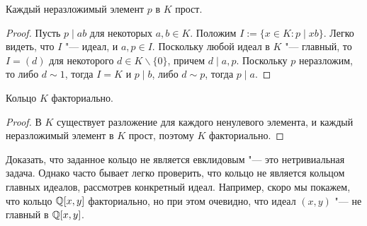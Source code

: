 \begin{proposition}
	Каждый неразложимый элемент $p$ в $K$ прост.
\end{proposition}

\begin{proof}
	Пусть $p \mid ab$ для некоторых $a, b \in K$. Положим $I := \{x \in K: p \mid xb\}$. Легко видеть, что $I$ "--- идеал, и $a, p \in I$. Поскольку любой идеал в $K$ "--- главный, то $I = (d)$ для некоторого $d \in K \backslash \{0\}$, причем $d \mid a, p$. Поскольку $p$ неразложим, то либо $d \sim 1$, тогда $I = K$ и $p \mid b$, либо $d \sim p$, тогда $p \mid a$.
\end{proof}

\begin{theorem}
	Кольцо $K$ факториально.
\end{theorem}

\begin{proof}
	В $K$ существует разложение для каждого ненулевого элемента, и каждый неразложимый элемент в $K$ прост, поэтому $K$ факториально.
\end{proof}

\begin{note}
	Доказать, что заданное кольцо не является евклидовым "--- это нетривиальная задача. Однако часто бывает легко проверить, что кольцо не является кольцом главных идеалов, рассмотрев конкретный идеал. Например, скоро мы покажем, что кольцо $\mathbb{Q}[x, y]$ факториально, но при этом очевидно, что идеал $(x, y)$ "--- не главный в $\mathbb{Q}[x, y]$.
\end{note}